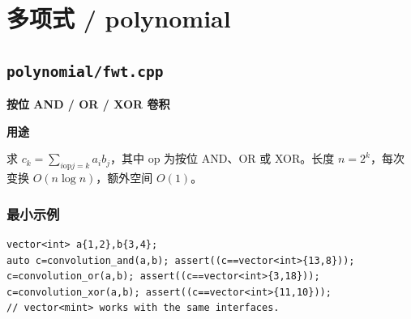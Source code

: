 \documentclass[UTF8,a4paper,10pt]{ctexart}
\newcommand{\TemplUsage}[1]{\textbf{用途}\par #1\par}
\begin{document}
\section{多项式 / polynomial}
\subsection{\texttt{polynomial/fwt.cpp}}
\textbf{按位 AND / OR / XOR 卷积}\par
\TemplUsage{求 $c_k=\sum_{i\mathbin{\mathrm{op}}j=k}a_i b_j$，其中 op 为按位 AND、OR 或 XOR。长度 $n=2^k$，每次变换 $O(n\log n)$，额外空间 $O(1)$。}
\subsubsection*{最小示例}
\begin{lstlisting}
vector<int> a{1,2},b{3,4};
auto c=convolution_and(a,b); assert((c==vector<int>{13,8}));
c=convolution_or(a,b); assert((c==vector<int>{3,18}));
c=convolution_xor(a,b); assert((c==vector<int>{11,10}));
// vector<mint> works with the same interfaces.
\end{lstlisting}
\end{document}
